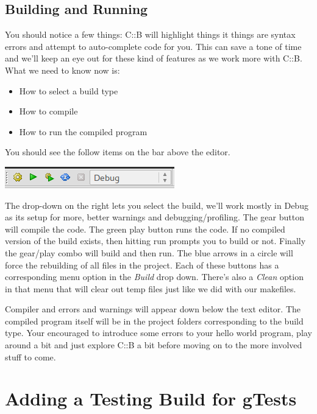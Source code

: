 \documentclass[10pt]{article}
\begin{document}
\subsection{Building and Running}

You should notice a few things: C::B will highlight things it things are syntax errors and attempt to auto-complete code for you. This can save a tone of time and we'll keep an eye out for these kind of features as we work more with C::B. What we need to know now is:
\begin{itemize}
\item How to select a build type
\item How to compile
\item How to run the compiled program
\end{itemize}

You should see the follow items on the bar above the editor.
\vspace{.1in}
\begin{center}
\includegraphics[scale=.5]{CB_BuildBar.png}
\end{center}
\vspace{.1in}

The drop-down on the right lets you select the build, we'll work mostly in Debug as its setup for more, better warnings and debugging/profiling. The gear button will compile the code. The green play button runs the code. If no compiled version of the build exists, then hitting run prompts you to build or not. Finally the gear/play combo will build and then run. The blue arrows in a circle will force the rebuilding of all files in the project. Each of these buttons has a corresponding menu option in the \textit{Build} drop down. There's also a \textit{Clean} option in that menu that will clear out temp files just like we did with our makefiles.

Compiler and errors and warnings will appear down below the text editor. The compiled program itself will be in the project folders corresponding to the build type. Your encouraged to introduce some errors to your hello world program, play around a bit and just explore C::B a bit before moving on to the more involved stuff to come.

\newpage
\section{Adding a Testing Build for gTests}
\end{document}

